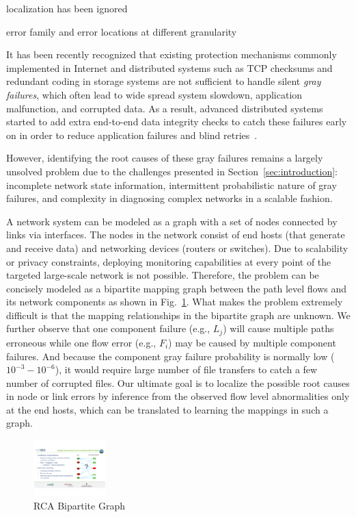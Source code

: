 localization has been ignored

error family and error locations at different granularity 




It has been recently recognized that existing protection mechanisms commonly implemented in Internet and distributed systems such as TCP checksums and redundant coding in storage systems are not sufficient to handle silent {\it gray failures}, which often lead to wide spread system slowdown, application malfunction, and corrupted data. As a result, advanced distributed systems started to add extra end-to-end data integrity checks to catch these failures early on in order to reduce application failures and blind retries~\cite{swip:pearc:2019}. 

However, identifying the root causes of these gray failures remains a largely unsolved problem due to the challenges presented in Section~\ref{sec:introduction}: 
incomplete network state information, intermittent probabilistic nature of gray failures, and complexity in diagnosing complex networks in a scalable fashion.  

A network system can be modeled as a graph with a set of nodes connected by links via interfaces. The nodes in the network consist of end hosts (that generate and receive data) and networking devices (routers or switches). Due to scalability or privacy constraints, deploying monitoring capabilities at every point of the targeted large-scale network is not possible. Therefore, the problem can be concisely modeled as a bipartite mapping graph between the path level flows and its network components as shown in Fig.~\ref{fig:bipartite}. What makes the problem extremely difficult is that the mapping relationships in the bipartite graph are unknown. We further observe that one component failure (e.g., $L_j$) will cause multiple paths erroneous while one flow error (e.g., $F_i$) may be caused by multiple component failures. And because the component gray failure probability is normally low ($10^{-3} - 10^{-6}$), it would require large number of file transfers to catch a few number of corrupted files. Our ultimate goal is to localize the possible root causes in node or link errors by inference from the observed flow level abnormalities only at the end hosts, which can be translated to learning the mappings in such a graph.

\begin{figure}
  \begin{center}
    \includegraphics[width=0.25\textwidth]{./figure/RCABipartite}
  \end{center}
  \vspace{-5pt}
\caption{RCA Bipartite Graph}
\vspace{-5pt}
\label{fig:bipartite}
\end{figure}

